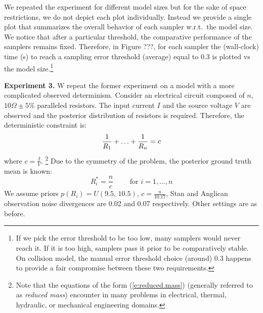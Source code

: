 \documentclass{article}
\newcommand{\pr}{p}
\begin{document}
{We repeated the experiment for different model sizes but for the sake of space restrictions, we do not depict each plot individually.
Instead we provide a single plot that summarizes the overall behavior of each sampler w.r.t.\ the model size.
We notice that after a particular threshold, the comparative performance of the samplers remains fixed.
Therefore, in Figure ???, for each sampler the (wall-clock) time (s) to reach a sampling error threshold (average) equal to 0.3 is plotted vs the model size.\footnote{
If we pick the error threshold to be too low, many samplers would never reach it. If it is too high, samplers pass it prior to be comparatively stable. On collision model, the manual error threshold choice (around) 0.3 happens to provide a fair compromise between these two requirements.  
}%

  
%


\textbf{Experiment 3.} W repeat the former experiment on a model with a more complicated observed determinism. 
Consider an electrical circuit composed of $n$, $10\Omega\pm5\%$ paralleled resistors.
The input current $I$ and the source voltage $V$ are observed
and the posterior distribution of resistors is required.
Therefore, the deterministic constraint is:
\begin{equation} \footnotesize 
\label{e:reduced.mass}
 \frac{1}{R_1} + \ldots + \frac{1}{R_n} = c
\end{equation}
where $c = \frac{I}{V}$.
\footnote{
Note that the equations of the form (\ref{e:reduced.mass}) (generally referred to as \emph{reduced mass}) encounter in many problems in electrical, thermal, hydraulic, or mechanical engineering domains. 
}
Due to the symmetry of the problem, the posterior ground truth mean is known:
\begin{equation*}
R_i^* = \frac{n}{c} \qquad \text{ for } i = 1, \ldots, n
\end{equation*}
We assume 
priors $\pr(R_i) = U(9.5, \, 10.5)$, 
$c = \frac{n}{10.17}$,
Stan and Anglican observation noise divergences are 
0.02 and 0.07 respectively. Other settings are as before.

}
\end{document}
